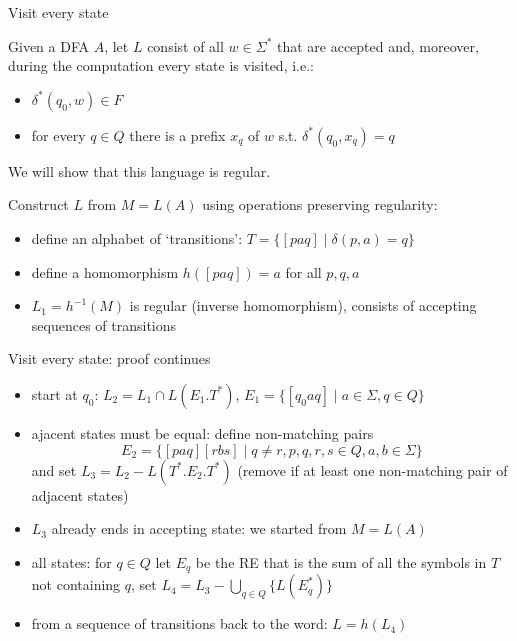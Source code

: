 \documentclass[handout]{beamer}
\begin{document}
\begin{frame}{Visit every state}

    \begin{example}
        Given a DFA $A$, let $L$ consist of all $w\in\Sigma^*$ that are accepted and, moreover, during the computation every state is visited, i.e.:
        \begin{itemize}
            \item $\delta^*(q_0,w)\in F$
            \item for every $q\in Q$ there is a prefix $x_q$ of $w$ s.t. $\delta^*(q_0,x_q)=q$
        \end{itemize}
        We will show that this language is regular.
    \end{example}
    Construct $L$ from $M=L(A)$ using operations preserving regularity:

    \begin{itemize}
        \item define an alphabet of `transitions': $T=\{[paq]\mid \delta(p,a)=q\}$
        \item define a homomorphism $h([paq])=a$ for all $p,q,a$
        \item $L_1=h^{-1}(M)$ is regular (inverse homomorphism), consists of accepting sequences of transitions
    \end{itemize}

\end{frame}


\begin{frame}{Visit every state: proof continues}

    \begin{itemize}
        \item start at $q_0$: $L_2=L_1\cap L(E_1.T^*)$, $E_1=\{[q_0aq]\mid a\in \Sigma, q\in Q\}$
        \item ajacent states must be equal: define non-matching pairs
        $$
        E_2=\{[paq][rbs]\mid q\neq r, p,q,r,s\in Q, a,b \in \Sigma\}$$
        and set $L_3=L_2-L(T^*.E_2.T^*)$ (remove if at least one non-matching pair of adjacent states)            
        \item $L_3$ already ends in accepting state: we started from $M=L(A)$
        \item all states: for $q\in Q$ let $E_q$ be the RE that is the sum of all the symbols in $T$ not containing $q$, set 
        $L_4=L_3-\bigcup_{q \in Q}\{L(E_q^*)\}$
        \item from a sequence of transitions back to the word: $L=h(L_4)$
    \end{itemize}\hfill\qedsymbol

\end{frame}
\end{document}
